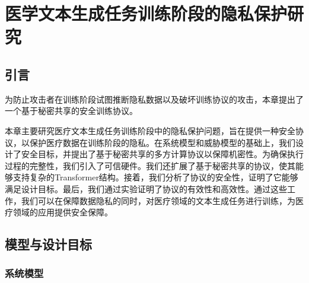 
\chapter{医学文本生成任务训练阶段的隐私保护研究}

\section{引言}

为防止攻击者在训练阶段试图推断隐私数据以及破坏训练协议的攻击，本章提出了一个基于秘密共享\cite{SecretSharingAS, Shamir_SS}的安全训练协议。


本章主要研究医疗文本生成任务训练阶段中的隐私保护问题，旨在提供一种安全协议，以保护医疗数据在训练阶段的隐私。在系统模型和威胁模型的基础上，我们设计了安全目标，并提出了基于秘密共享的多方计算协议以保障机密性。为确保执行过程的完整性，我们引入了可信硬件。我们还扩展了基于秘密共享的协议，使其能够支持复杂的Transformer结构。接着，我们分析了协议的安全性，证明了它能够满足设计目标。最后，我们通过实验证明了协议的有效性和高效性。通过这些工作，我们可以在保障数据隐私的同时，对医疗领域的文本生成任务进行训练，为医疗领域的应用提供安全保障。

\section{模型与设计目标} \label{chap2_system_model}

\subsection{系统模型}


